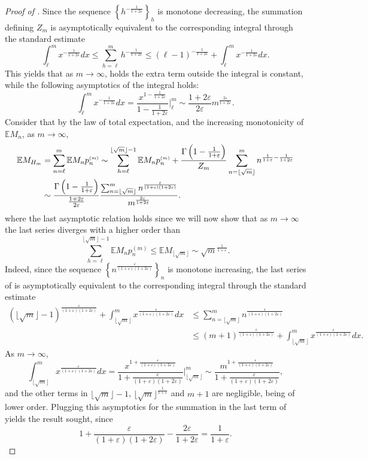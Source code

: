 \documentclass[11pt, a4paper, twoside]{article}
\newcommand{\ssup}[1]{{\scriptscriptstyle{({#1})}}}
\newcommand{\eps}{\varepsilon}
\newcommand{\EE}{\mathbb{E}}
\numberwithin{equation}{section}
\begin{document}
    \begin{proof}[Proof of ]
		Since the sequence $\left\lbrace h^{-\frac{1}{1+2\eps}}\right\rbrace_h$ is monotone decreasing, the summation defining $Z_m$ is asymptotically equivalent to the corresponding integral through the standard estimate \[\int_{\ell}^{m}x^{-\frac{1}{1+2\eps}}dx\le\sum_{h=\ell}^m h^{-\frac{1}{1+2\eps}}\le (\ell-1)^{-\frac{1}{1+2\eps}}+\int_{\ell}^{m}x^{-\frac{1}{1+2\eps}}dx.\] This yields that as $m\longrightarrow\infty$,  holds the extra term outside the integral is constant, while the following asymptotics of the integral holds:
		\[\int_{\ell}^mx^{-\frac{1}{1+2\eps}}dx=\frac{x^{1-\frac{1}{1+2\eps}}}{1-\frac{1}{1+2\eps}}\bigg\vert_{\ell}^m\sim\frac{1+2\eps}{2\eps} m^{\frac{2\eps}{1+2\eps}}.\]
		Consider that by the law of total expectation,  and the increasing monotonicity of $\EE M_n$, as $m\longrightarrow\infty$, 
		\begin{align}\label{asympH_m}
			\EE M_{H_m}&=\sum_{n=\ell}^m\EE M_n p_n^\ssup{m}\sim\sum_{h=\ell}^{\lfloor \sqrt{m}\rfloor-1}\EE M_n p_n^\ssup{m}+ \frac{\Gamma\left(1-\frac{1}{1+\eps}\right)}{Z_m}\sum_{n=\lfloor \sqrt{m}\rfloor}^mn^{\frac{1}{1+\eps}-\frac{1}{1+2\eps}}\notag\\&\sim\frac{\Gamma\left(1-\frac{1}{1+\eps}\right)}{\frac{1+2\eps}{2\eps}} \frac{\sum_{n=\lfloor \sqrt{m}\rfloor}^mn^{\frac{\eps}{(1+\eps)(1+2\eps)}}}{ m^{\frac{2\eps}{1+2\eps}}}.
		\end{align}
		where the last asymptotic relation holds since we will now show that as $m\longrightarrow \infty$ the last series diverges with a higher order than \[\sum_{h=\ell}^{\lfloor \sqrt{m}\rfloor-1}\EE M_n p_n^\ssup{m}\le\EE M_{\lfloor \sqrt{m}\rfloor}\sim\sqrt{m}^{\frac{1}{1+\eps}}.\] 
		Indeed, since the sequence $\left\lbrace n^{\frac{\eps}{(1+\eps)(1+2\eps)}}\right\rbrace_n$ is monotone increasing, the last series of  is asymptotically equivalent to the corresponding integral through the standard estimate 
		\begin{align*}
			(\lfloor \sqrt{m}\rfloor-1)^{\frac{\eps}{(1+\eps)(1+2\eps)}}+\int_{\lfloor \sqrt{m}\rfloor}^{m}x^{\frac{\eps}{(1+\eps)(1+2\eps)}}dx&\le\sum_{n=\lfloor \sqrt{m}\rfloor}^mn^{\frac{\eps}{(1+\eps)(1+2\eps)}}\\&\le (m+1)^{\frac{\eps}{(1+\eps)(1+2\eps)}}+ \int_{\lfloor \sqrt{m}\rfloor}^{m}x^{\frac{\eps}{(1+\eps)(1+2\eps)}}dx.
		\end{align*} As $m\longrightarrow\infty$,
		\begin{equation}
			\int_{\lfloor \sqrt{m}\rfloor}^m x^{\frac{\eps}{(1+\eps)(1+2\eps)}}dx=\frac{x^{1+\frac{\eps}{(1+\eps)(1+2\eps)}}}{1+\frac{\eps}{(1+\eps)(1+2\eps)}}\bigg\vert_{\lfloor \sqrt{m}\rfloor}^m\sim\frac{m^{1+\frac{\eps}{(1+\eps)(1+2\eps)}}}{1+\frac{\eps}{(1+\eps)(1+2\eps)}} ,
		\end{equation}
		and the other terms in $\lfloor \sqrt{m}\rfloor-1$, $\lfloor \sqrt{m}\rfloor^{\frac{1}{1+\eps}}$ and $m+1$ are negligible, being of lower order. Plugging this asymptotics for the summation in the last term of  yields the result sought, since \[1+\frac{\eps}{(1+\eps)(1+2\eps)}-\frac{2\eps}{1+2\eps}=\frac{1}{1+\eps}.\]
	\end{proof}
	
\end{document}
